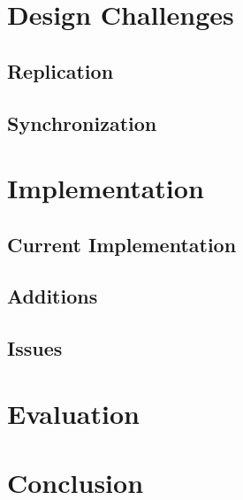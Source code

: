 \documentclass[12pt,twocolumn]{article}
\begin{document}
\section{Design Challenges}
\subsection{Replication}
\subsection{Synchronization}





\section{Implementation}

\subsection{Current Implementation}

\subsection{Additions}

\subsection{Issues}




\section{Evaluation}




\section{Conclusion}
\end{document}
